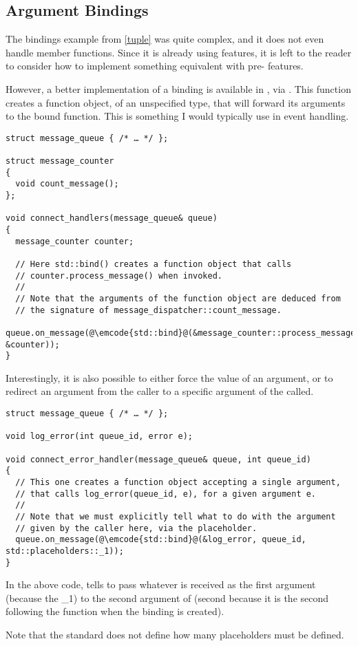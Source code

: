 \subsection{Argument Bindings}

The bindings example from \ref{tuple} was quite complex, and it does
not even handle member functions. Since it is already using 
features, it is left to the reader to consider how to implement
something equivalent with pre- features.

%
%
However, a better implementation of a binding is available in ,
via . This function creates a function object, of an
unspecified type, that will forward its arguments to the bound
function. This is something I would typically use in event handling.

\begin{lstlisting}
struct message_queue { /* … */ };

struct message_counter
{
  void count_message();
};

void connect_handlers(message_queue& queue)
{
  message_counter counter;

  // Here std::bind() creates a function object that calls
  // counter.process_message() when invoked.
  //
  // Note that the arguments of the function object are deduced from
  // the signature of message_dispatcher::count_message.
  queue.on_message(@\emcode{std::bind}@(&message_counter::process_message, &counter));
}
\end{lstlisting}

Interestingly, it is also possible to either force the value of an
argument, or to redirect an argument from the caller to a specific
argument of the called.

\begin{lstlisting}
struct message_queue { /* … */ };

void log_error(int queue_id, error e);

void connect_error_handler(message_queue& queue, int queue_id)
{
  // This one creates a function object accepting a single argument,
  // that calls log_error(queue_id, e), for a given argument e.
  //
  // Note that we must explicitly tell what to do with the argument
  // given by the caller here, via the placeholder.
  queue.on_message(@\emcode{std::bind}@(&log_error, queue_id, std::placeholders::_1));
}
\end{lstlisting}

In the above code,  tells
 to pass whatever is received as the first argument
(because the \_1) to the second argument of  (second
because it is the second following the function when the binding is
created).

Note that the standard does not define how many placeholders must be
defined.
